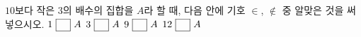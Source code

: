 $10$보다 작은 $3$의 배수의 집합을 $A$라 할 때, 다음 \blank{} 안에 기호 $\in$, $\notin$ 중 알맞은 것을 써넣으시오.
 $1\ \blank\ A$
 $3\ \blank\ A$
 $9\ \blank\ A$
 $12\ \blank\ A$
